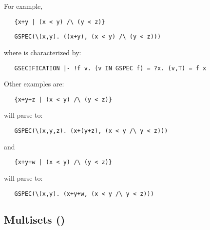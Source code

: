 For example,

\begin{hol}\begin{verbatim}
   {x+y | (x < y) /\ (y < z)}
\end{verbatim}\end{hol}


\begin{hol}\begin{verbatim}
   GSPEC(\(x,y). ((x+y), (x < y) /\ (y < z)))
\end{verbatim}\end{hol}

\noindent where  is characterized by:

\begin{hol}\begin{verbatim}
   GSECIFICATION |- !f v. (v IN GSPEC f) = ?x. (v,T) = f x
\end{verbatim}\end{hol}
%
Other examples are:

\begin{hol}\begin{verbatim}
   {x+y+z | (x < y) /\ (y < z)}
\end{verbatim}\end{hol}

\noindent will parse to:

\begin{hol}\begin{verbatim}
   GSPEC(\(x,y,z). (x+(y+z), (x < y /\ y < z)))
\end{verbatim}\end{hol}

\noindent and

\begin{hol}\begin{verbatim}
   {x+y+w | (x < y) /\ (y < z)}
\end{verbatim}\end{hol}

\noindent will parse to:

\begin{hol}\begin{verbatim}
   GSPEC(\(x,y). (x+y+w, (x < y /\ y < z)))
\end{verbatim}\end{hol}

\subsection{Multisets ()}\label{multiset}

